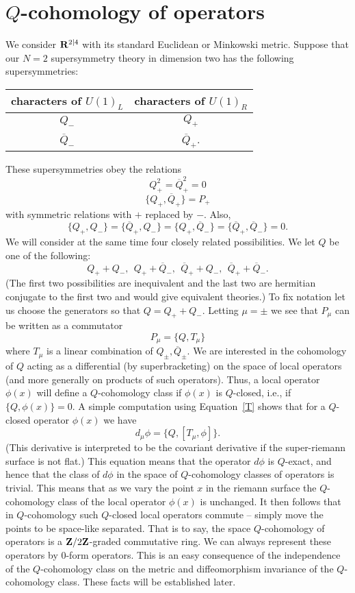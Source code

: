 \section{$Q$-cohomology of operators}
We consider ${\bf R}^{2|4}$ with its standard Euclidean or Minkowski
metric. 
Suppose that our $N=2$ supersymmetry theory in dimension two has the
following supersymmetries: 
\begin{center}
\begin{tabular}{c|c}
 characters of $U(1)_L$ &  characters of $U(1)_R$ \\ \hline
$Q_-$ & $Q_+$ \\ 
$\overline Q_-$ & $\overline Q_+$. \\
\end{tabular}
\end{center}
These supersymmetries obey the relations
$$Q_+^2=\overline Q_+^2=0$$
$$\{Q_+,\overline Q_+\}=P_+$$
with symmetric relations with $+$ replaced by $-$.
Also,
$$\{Q_+,Q_-\}=\{\overline Q_+,Q_-\}=\{Q_+,\overline Q_-\}=\{\overline
Q_+,\overline Q_-\}=0.$$
We will consider at the same time four closely related possibilities.  We
let $Q$ be one of the following:
$$Q_++Q_-, \ \ 
Q_++\overline Q_-,\ \ 
\overline Q_++Q_-,\ \ 
\overline Q_++\overline Q_-.$$
(The first two possibilities are inequivalent and the last two are
hermitian conjugate to the first two and would give equivalent theories.)
To fix notation let us choose the generators so that $Q=Q_++Q_-$.
Letting $\mu=\pm$ we see that $P_\mu$ can be written as a commutator
\begin{equation}\label{T}
P_\mu=\{Q,T_\mu\}
\end{equation}
where $T_\mu$ is a linear combination of $Q_\pm,\overline Q_\pm$.
We are interested in the cohomology of $Q$ acting as a differential
(by superbracketing) on
the space of local operators (and more generally on products of such
operators). Thus, a local operator $\phi(x)$ will 
define a $Q$-cohomology class if $\phi(x)$ is $Q$-closed, i.e., if
$\{Q,\phi(x)\}=0$. 
A simple computation using Equation~\ref{T} shows that for a $Q$-closed
operator $\phi(x)$ we have
$$d_\mu\phi=\{Q,[T_\mu,\phi]\}.$$
(This derivative is interpreted to be the covariant derivative if the
super-riemann surface is not flat.)
This equation means that the
operator $d\phi$ is $Q$-exact, and hence that the class of
$d\phi$ in  the space of $Q$-cohomology classes of operators is
trivial. 
This means that as we vary the point $x$ in the riemann surface the
$Q$-cohomology class of the local operator $\phi(x)$ is unchanged.
It then follows that in  $Q$-cohomology
such $Q$-closed local operators commute -- simply move the points to
be space-like separated.
That is to say, the space $Q$-cohomology of operators is a ${\bf
Z}/2{\bf Z}$-graded commutative ring.
We can always represent these operators by $0$-form
operators. This is an easy consequence of the independence of the
$Q$-cohomology class on the metric and diffeomorphism
invariance of the $Q$-cohomology class. These facts will be
established later.

